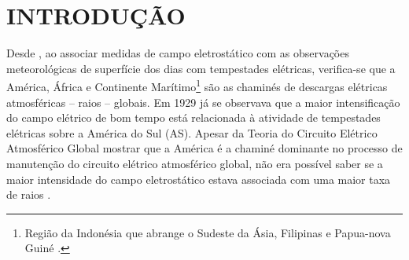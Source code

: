 \chapter{INTRODUÇÃO}

Desde , ao associar medidas de campo eletrostático com as observações meteorológicas de superfície dos dias com tempestades elétricas, verifica-se que a  América, África e Continente Marítimo\footnote{Região da Indonésia que abrange o Sudeste da Ásia, Filipinas e Papua-nova Guiné \cite{ramage1968,neale2003}.} são as chaminés de descargas elétricas atmosféricas -- raios -- globais. Em 1929 já se observava que a maior intensificação do campo elétrico de bom tempo está relacionada à atividade de tempestades elétricas sobre a América do Sul (AS). Apesar da Teoria do Circuito Elétrico Atmosférico Global mostrar que a América é a chaminé dominante no processo de manutenção do circuito elétrico atmosférico global, não era possível saber se a maior intensidade do campo eletrostático estava associada com uma maior taxa de raios \cite{dolezalek1972}.




